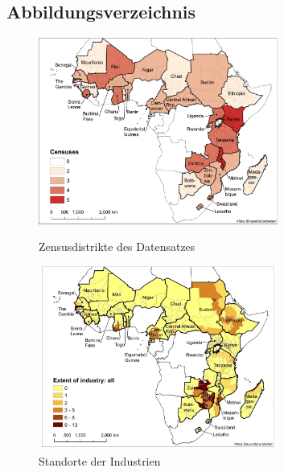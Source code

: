 \hypertarget{lof}{%
\subsection{Abbildungsverzeichnis}\label{lof}}

\begin{figure}[H]

{\centering \includegraphics[width=0.7\textwidth]{../../images/2022-06-28_10-00-00.jpg}

}

\caption{Zensusdistrikte des Datensatzes}


{\centering \includegraphics[width=0.7\textwidth]{../../images/2022-06-28_10-00-01.jpg}

}

\caption{Standorte der Industrien}

\end{figure}

\newpage
{}

